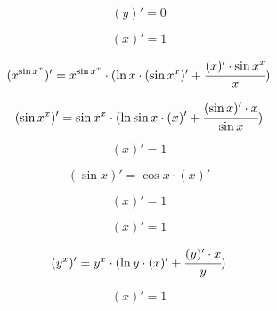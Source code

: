 \begin{dmath}
( y )' = 0
\end{dmath}




\begin{dmath}
( x )' = 1
\end{dmath}




\begin{dmath}
({ x } ^ {{ \sin  x } ^ { x }})' = { x } ^ {{ \sin  x } ^ { x }} \cdot ( \ln  x  \cdot ({ \sin  x } ^ { x })' +  \cfrac {( x )' \cdot { \sin  x } ^ { x }}{ x })
\end{dmath}




\begin{dmath}
({ \sin  x } ^ { x })' = { \sin  x } ^ { x } \cdot ( \ln  \sin  x  \cdot ( x )' +  \cfrac {( \sin  x )' \cdot  x }{ \sin  x })
\end{dmath}




\begin{dmath}
( x )' = 1
\end{dmath}




\begin{dmath}
( \sin  x )' =  \cos  x  \cdot ( x )'
\end{dmath}




\begin{dmath}
( x )' = 1
\end{dmath}




\begin{dmath}
( x )' = 1
\end{dmath}




\begin{dmath}
({ y } ^ { x })' = { y } ^ { x } \cdot ( \ln  y  \cdot ( x )' +  \cfrac {( y )' \cdot  x }{ y })
\end{dmath}




\begin{dmath}
( x )' = 1
\end{dmath}



